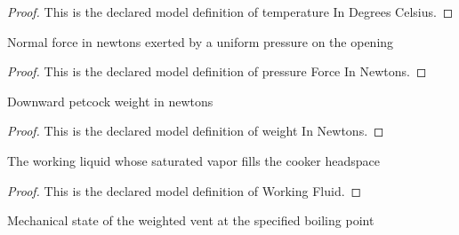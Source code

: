 \begin{proof}
  This is the declared model definition of temperature In Degrees Celsius.
\end{proof}
\begin{definition}
  \label{def:physics:phyx-mini-0440:phyxminiproblems-problemphyxmini0440-pressureforceinnewtons}
  Normal force in newtons exerted by a uniform pressure on the opening
\end{definition}
\begin{proof}
  This is the declared model definition of pressure Force In Newtons.
\end{proof}
\begin{definition}
  \label{def:physics:phyx-mini-0440:phyxminiproblems-problemphyxmini0440-weightinnewtons}
  Downward petcock weight in newtons
\end{definition}
\begin{proof}
  This is the declared model definition of weight In Newtons.
\end{proof}
\begin{definition}
  \label{def:physics:phyx-mini-0440:phyxminiproblems-problemphyxmini0440-workingfluid}
  The working liquid whose saturated vapor fills the cooker headspace
\end{definition}
\begin{proof}
  This is the declared model definition of Working Fluid.
\end{proof}
\begin{definition}
  \label{def:physics:phyx-mini-0440:phyxminiproblems-problemphyxmini0440-petcockstate}
  Mechanical state of the weighted vent at the specified boiling point
\end{definition}

